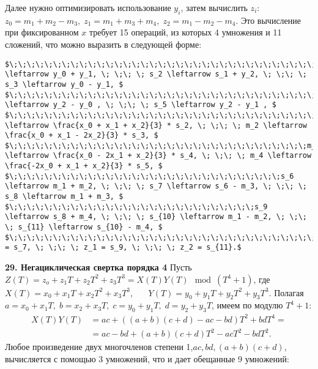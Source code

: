 \documentclass{../../template/mai_book}
\begin{document}
Далее нужно оптимизировать использование $y_i$, затем вычислить \newline $z_i$: $z_0 = m_1 + m_2 - m_3, \; z_1 = m_1 + m_3 + m_4, \; z_2 = m_1 - m_2 - m_4$. Это вычисление при фиксированном $x$ требует 15 операций, из которых 4 умножения и 11 сложений, что можно выразить в следующей форме:
\begin{lstlisting}[mathescape=true]
$\;\;\;\;\;\;\;\;\;\;\;\;\;\;\;\;\;\;\;\;\;\;\;\;\;\;\;\;\;\;\;\;\;\;\;s_1 \leftarrow y_0 + y_1, \; \;\; \; s_2 \leftarrow s_1 + y_2, \; \;\; \; s_3 \leftarrow y_0 - y_1, $  
$\;\;\;\;\;\;\;\;\;\;\;\;\;\;\;\;\;\;\;\;\;\;\;\;\;\;\;\;\;\;\;\;\;\;\;\;\;\;\;\;\;\;\;\;\;\;\;\;s_4 \leftarrow y_2 - y_0 , \; \;\; \; s_5 \leftarrow y_2 - y_1 , $ 
$\;\;\;\;\;\;\;\;\;\;\;\;\;\;\;\;\;\;\;\;\;\;\;\;\;\;\;\;\;\;\;\;\;\;\;\;\;m_1 \leftarrow \frac{x_0 + x_1 + x_2}{3} * s_2, \; \;\; \; m_2 \leftarrow \frac{x_0 + x_1 - 2x_2}{3} * s_3, $ 
$\;\;\;\;\;\;\;\;\;\;\;\;\;\;\;\;\;\;\;\;\;\;\;\;\;\;\;\;\;\;\;\;\;\;m_3 \leftarrow \frac{x_0 - 2x_1 + x_2}{3} * s_4, \; \;\; \; m_4 \leftarrow \frac{-2x_0 + x_1 + x_2}{3} * s_5, $ 
$\;\;\;\;\;\;\;\;\;\;\;\;\;\;\;\;\;\;\;\;\;\;\;\;\;\;\;\;\;\;\;s_6 \leftarrow m_1 + m_2, \; \;\; \; s_7 \leftarrow s_6 - m_3, \; \;\; \; s_8 \leftarrow m_1 + m_3, $ 
$\;\;\;\;\;\;\;\;\;\;\;\;\;\;\;\;\;\;\;\;\;\;\;\;\;\;\;\;s_9 \leftarrow s_8 + m_4, \; \;\; \; s_{10} \leftarrow m_1 - m_2, \; \;\; \; s_{11} \leftarrow s_{10} - m_4, $ 
$\;\;\;\;\;\;\;\;\;\;\;\;\;\;\;\;\;\;\;\;\;\;\;\;\;\;\;\;\;\;\;\;\;\;\;\;\;\;\;\;\;\;\;\;\;\;\;z_0 = s_7, \; \;\; \; z_1 = s_9, \; \;\; \; z_2 = s_{11}.$
\end{lstlisting}
\newpage
\noindent
\textbf{29. Негациклическая свертка порядка 4} \newline \newline
\indent Пусть $Z(T) = z_o + z_1 T + z_2 T^2 + z_3 T^3 = X(T)Y(T) \mod (T^4 + 1)$, где \newline \newline \indent $X(T) = x_0 + x_1 T + x_2 T^2 + x_3 T^3, \; \; \; \; \; \; Y(T) = y_0 + y_1 T + y_2 T^2 + y_3 T^3$. \newline
\newline
Полагая $a = x_0 + x_1 T, \; b = x_2 + x_3 T, \; c = y_0 + y_1 T, \; d = y_2 + y_3 T$, имеем по модулю $T^4 + 1:$ 
\begin{align*}
X(T)Y(T) &= ac + ((a + b)(c + d) - ac - bd)T^2 + bdT^4 = \\
&= ac - bd + (a + b)(c + d)T^2 - acT^2 - bdT^2.
\end{align*}
Любое произведение двух многочленов степени 1,$ac,bd,(a + b)(c + d)$, вычисляется с помощью 3 умножений, что и дает обещанные 9 умно­жений: \newline \newline \indent
\end{document}
